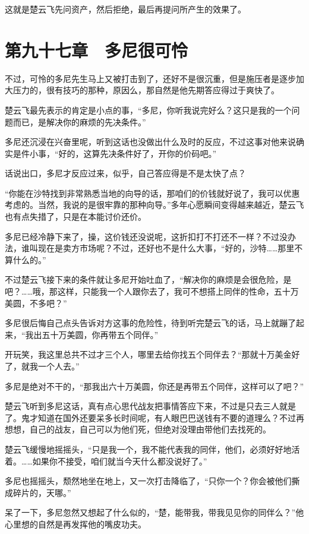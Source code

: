 这就是楚云飞先问资产，然后拒绝，最后再提问所产生的效果了。

\section{第九十七章　多尼很可怜}

不过，可怜的多尼先生马上又被打击到了，还好不是很沉重，但是施压者是逐步加大压力的，很有技巧的那种，原因么，那自然是他先期答应得过于爽快了。

楚云飞最先表示的肯定是小点的事，“多尼，你听我说完好么？这只是我的一个问题而已，是解决你的麻烦的先决条件。”

多尼还沉浸在兴奋里呢，听到这话也没做出什么及时的反应，不过这事对他来说确实是件小事，“好的，这算先决条件好了，开你的价码吧。”

话说出口，多尼才反应过来，似乎，自己答应得是不是太快了点？

“你能在沙特找到非常熟悉当地的向导的话，那咱们的价钱就好说了，我可以优惠考虑的。当然，我说的是很牢靠的那种向导。”多年心愿瞬间变得越来越近，楚云飞也有点失措了，只是在本能讨价还价。

多尼已经冷静下来了，操，这价钱还没说呢，这折扣打不打还不一样？不过没办法，谁叫现在是卖方市场呢？不过，还好也不是什么大事，“好的，沙特……那里不算什么的。”

不过楚云飞接下来的条件就让多尼开始吐血了，“解决你的麻烦是会很危险，是吧？……哦，那这样，只能我一个人跟你去了，我可不想搭上同伴的性命，五十万美圆，不多吧？”

多尼很后悔自己点头告诉对方这事的危险性，待到听完楚云飞的话，马上就蹦了起来，“我出五十万美圆，你再带五个同伴。”

开玩笑，我这里总共不过才三个人，哪里去给你找五个同伴去？“那就十万美金好了，就我一个人去。”

多尼是绝对不干的，“那我出六十万美圆，你还是再带五个同伴，这样可以了吧？”

楚云飞听到多尼这话，真有点心思代战友把事情答应下来，不过是只去三人就是了。鬼才知道在国外还要呆多长时间呢，有人眼巴巴送钱有不要的道理么？不过再想想，自己的战友，自己可以为他们死，但绝对没理由带他们去找死的。

楚云飞缓慢地摇摇头，“只是我一个，我不能代表我的同伴，他们，必须好好地活着。……如果你不接受，咱们就当今天什么都没说好了。”

多尼也摇摇头，颓然地坐在地上，又一次打击降临了，“只你一个？你会被他们撕成碎片的，天哪。”

呆了一下，多尼忽然又想起了什么似的，“楚，能带我，带我见见你的同伴么？”他心里想的自然是再发挥他的嘴皮功夫。

